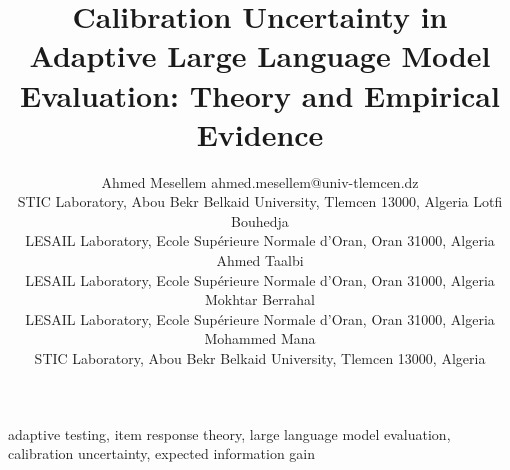 \documentclass[twoside,11pt]{article}
\begin{document}
\title{Calibration Uncertainty in Adaptive Large Language Model Evaluation: Theory and Empirical Evidence}

\author{\name Ahmed Mesellem \email ahmed.mesellem@univ-tlemcen.dz \\
       \addr STIC Laboratory, Abou Bekr Belkaid University, Tlemcen 13000, Algeria
       \AND
       \name Lotfi Bouhedja \\
       \addr LESAIL Laboratory, Ecole Supérieure Normale d'Oran, Oran 31000, Algeria
       \AND
       \name Ahmed Taalbi \\
       \addr LESAIL Laboratory, Ecole Supérieure Normale d'Oran, Oran 31000, Algeria
       \AND
       \name Mokhtar Berrahal \\
       \addr LESAIL Laboratory, Ecole Supérieure Normale d'Oran, Oran 31000, Algeria
       \AND
       \name Mohammed Mana \\
       \addr STIC Laboratory, Abou Bekr Belkaid University, Tlemcen 13000, Algeria}

\maketitle



\begin{keywords}
  adaptive testing, item response theory, large language model evaluation,
  calibration uncertainty, expected information gain
\end{keywords}












\vskip 0.2in

\end{document}
